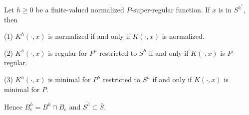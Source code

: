Let $h \geq 0$ be a finite-valued normalized $P$-super-regular function. If $x$ is in $S^{h^*}$, then

(1) $K^h(\cdot, x)$ is normalized if and only if $K(\cdot, x)$ is normalized.

(2) $K^h(\cdot, x)$ is regular for $P^h$ restricted to $S^h$ if and only if $K(\cdot, x)$ is $P$-regular.

(3) $K^h(\cdot, x)$ is minimal for $P^h$ restricted to $S^h$ if and only if $K(\cdot, x)$ is minimal for $P$.

Hence $B_e^h = B^h \cap B_e$ and $\overline{S^h} \subset \bar{S}$.
